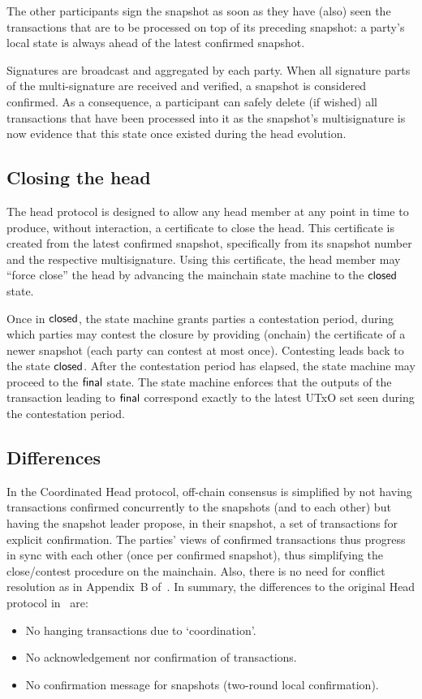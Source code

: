 The other participants sign the snapshot as soon as they have (also) seen the
transactions that are to be processed on top of its preceding snapshot: a
party's local state is always ahead of the latest confirmed snapshot.

Signatures are broadcast and aggregated by each party. When all signature parts
of the multi-signature are received and verified, a snapshot is considered
confirmed. As a consequence, a participant can safely delete (if wished) all
transactions that have been processed into it as the snapshot's multisignature
is now evidence that this state once existed during the head evolution.

\subsection{Closing the head}

The head protocol is designed to allow any head member at any point in time to
produce, without interaction, a certificate to close the head. This certificate
is created from the latest confirmed snapshot, specifically from its snapshot
number and the respective multisignature. Using this certificate, the head
member may ``force close'' the head by advancing the mainchain state machine to
the $\mathsf{closed}$ state.

Once in $\mathsf{closed}$, the state machine grants parties a contestation period,
during which parties may contest the closure by providing (onchain)
the certificate of a newer snapshot (each party can contest at most once). Contesting leads back to the state
$\mathsf{closed}$. After the contestation period has elapsed, the state machine may
proceed to the $\mathsf{final}$ state. The state machine enforces that the outputs of
the transaction leading to $\mathsf{final}$ correspond exactly to the latest UTxO set
seen during the contestation period.

\subsection{Differences}
In the Coordinated Head protocol, off-chain consensus is simplified by not
having transactions confirmed concurrently to the snapshots (and to each other)
but having the snapshot leader propose, in their snapshot, a set of transactions
for explicit confirmation. The parties' views of confirmed transactions thus
progress in sync with each other (once per confirmed snapshot), thus simplifying
the close/contest procedure on the mainchain. Also, there is no need for
conflict resolution as in Appendix~B of~\cite{hydrahead20}. In summary, the
differences to the original Head protocol in~\cite{hydrahead20} are:

\begin{itemize}
  \item No hanging transactions due to `coordination'.
  \item No acknowledgement nor confirmation of transactions.
  \item No confirmation message for snapshots (two-round local confirmation).
\end{itemize}

